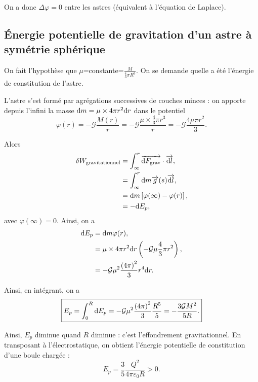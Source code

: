     On a donc $\Delta \varphi=0$ entre les astres (équivalent à l'équation de Laplace).

    \subsection{Énergie potentielle de gravitation d'un astre à symétrie sphérique}

        On fait l'hypothèse que $\mu$=constante=$\frac{M}{\frac{4}{3}\pi R^{3}}$. On se demande quelle a été l'énergie de constitution de l'astre.

        L'astre s'est formé par agrégations successives de couches minces : on apporte depuis l'infini la masse $\mathrm{d} m=\mu\times 4\pi r^{2}\mathrm{d} r$ dans le potentiel 
        \begin{equation*}
            \varphi(r)=-\mathcal{G}\frac{M(r)}{r}=-\mathcal{G}\frac{\mu\times\frac{4}{3}\pi r^{3}}{r}=-\mathcal{G}\frac{4\mu\pi r^{2}}{3}.
        \end{equation*}

        Alors 
        \begin{align*}
            \delta W_{\text{gravitationnel}}
            &=\int_{\infty}^{r}\protect\overrightarrow{{\mathrm{d} F_{\text{grav}}}}\cdot\protect\overrightarrow{{\mathrm{d} l}},\\
            &=\int_{\infty}^{r}\mathrm{d} m\protect\overrightarrow{{g}}(s)\protect\overrightarrow{{\mathrm{d} l}},\\
            &=
            \mathrm{d} m\left[
                \varphi(\infty)-\varphi(r)
            \right],\\
            &=
            -\mathrm{d} E_p,
        \end{align*}
        avec $\varphi(\infty)=0$. Ainsi, on a 
        \begin{align*}
            \mathrm{d} E_p
            &=
            \mathrm{d} m\varphi(r),\\
            &=
            \mu\times 4\pi r^{2}\mathrm{d} r\left(-\mathcal{G}\mu\frac{4}{3}\pi r^{2}\right),\\
            &=
            -\mathcal{G}\mu^{2}\frac{\left(4\pi\right)^{2}}{3}r^{4}\mathrm{d} r.
        \end{align*}

        Ainsi, en intégrant, on a 
        \begin{equation*}
            \boxed{
                E_p=\int_{0}^{R}\mathrm{d} E_p=-\mathcal{G}\mu^{2}\frac{\left(4\pi\right)^{2}}{3}\frac{R^{5}}{5}=-\frac{3\mathcal{G}M^{2}}{5R}.
            }
        \end{equation*}

        Ainsi, $E_p$ diminue quand $R$ diminue : c'est l'effondrement gravitationnel. En transposant à l'électrostatique, on obtient l'énergie potentielle de constitution d'une boule chargée :
        \begin{equation*}
            \boxed{
                E_p=\frac{3}{5}\frac{Q^{2}}{4\pi\varepsilon_0 R}>0.
            }
        \end{equation*}